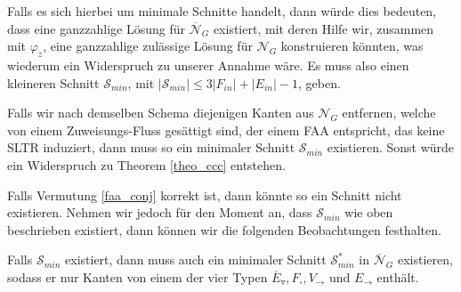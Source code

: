 Falls es sich hierbei um minimale Schnitte handelt, dann würde dies bedeuten, dass eine ganzzahlige Lösung für $\overline{\mathcal{N}}_G$ existiert, mit deren Hilfe wir, zusammen mit $\varphi_z$, eine ganzzahlige zulässige Lösung für $\mathcal{N}_G$ konstruieren könnten, was wiederum ein Widerspruch zu unserer Annahme wäre. Es muss also einen kleineren Schnitt $\mathcal{S}_{min}$, mit $|\mathcal{S}_{min}| \leq 3|F_{in}| + |E_{in}| - 1$, geben. 

\begin{remark}
Falls wir nach demselben Schema diejenigen Kanten aus $\mathcal{N}_G$ entfernen, welche von einem Zuweisungs-Fluss gesättigt sind, der einem FAA entspricht, das keine SLTR induziert, dann muss so ein minimaler Schnitt $\mathcal{S}_{min}$ existieren. Sonst würde ein Widerspruch zu Theorem \ref{theo_ccc} entstehen.
\end{remark}

Falls Vermutung \ref{faa_conj} korrekt ist, dann könnte so ein Schnitt nicht existieren. Nehmen wir jedoch für den Moment an, dass $\mathcal{S}_{min}$ wie oben beschrieben existiert, dann können wir die folgenden Beobachtungen festhalten.

\begin{claim} \label{cut_types1}
Falls $\mathcal{S}_{min}$ existiert, dann muss auch ein minimaler Schnitt $\mathcal{S}_{min}^*$ in $\overline{\mathcal{N}}_G$ existieren, sodass er nur Kanten von einem der vier Typen $\overline{E}_\triangledown, F_\square, V_\to$ und $E_\to$ enthält.
\end{claim}


